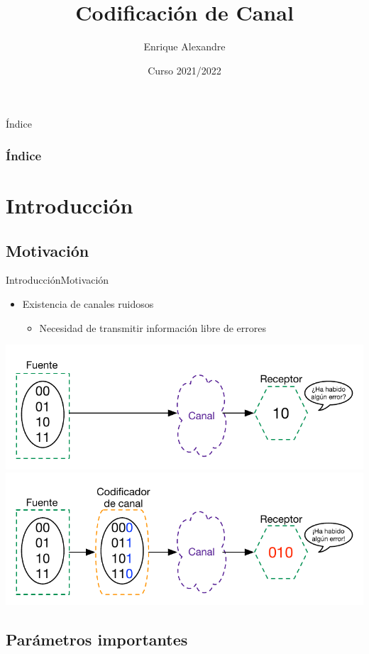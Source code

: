 \documentclass[10pt,compress]{beamer} %
\title[Codificación de Canal]{Codificación de Canal}
\author{Enrique Alexandre}
\institute{Dpto. de Teoría de la Señal y Comunicaciones}
\date{Curso 2021/2022}
\begin{document}
{\titlepageBlue
    \begin{frame}
        \titlepage
    \end{frame}
}

{
\begin{frame}[shrink]{Índice}
 \frametitle{Índice}
 \tableofcontents
\end{frame}
}

\section{Introducción}

\subsection{Motivación}

\begin{frame}{Introducción}{Motivación}
    \begin{itemize}
		\item Existencia de canales ruidosos
		\begin{itemize}
			\item Necesidad de transmitir información libre de errores
		\end{itemize}
	\end{itemize}
	\centering \includegraphics[width=0.7\linewidth]{Figuras/CodificacionDeCanal1.pdf}
	\centering \includegraphics[width=0.7\linewidth]{Figuras/CodificacionDeCanal2.pdf}
\end{frame}

\subsection{Parámetros importantes}
\end{document}
